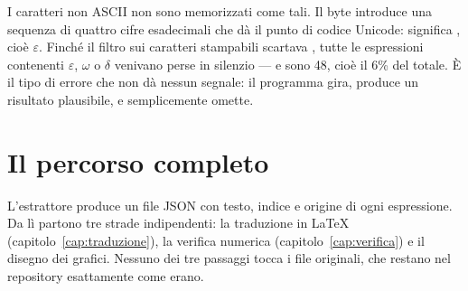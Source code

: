 \begin{osservazione}
I caratteri non ASCII non sono memorizzati come tali. Il byte 
introduce una sequenza di quattro cifre esadecimali che d\`a il punto di
codice Unicode:  significa , cio\`e
$\varepsilon$. Finch\'e il filtro sui caratteri stampabili scartava
, tutte le espressioni contenenti $\varepsilon$, $\omega$ o
$\delta$ venivano perse in silenzio --- e sono 48, cio\`e il 6\% del
totale. \`E il tipo di errore che non d\`a nessun segnale: il programma
gira, produce un risultato plausibile, e semplicemente omette.
\end{osservazione}

\section{Il percorso completo}

\begin{center}
\end{center}

\noindent
L'estrattore produce un file JSON con testo, indice e origine di ogni
espressione. Da l\`i partono tre strade indipendenti: la traduzione in
\LaTeX{} (capitolo~\ref{cap:traduzione}), la verifica numerica
(capitolo~\ref{cap:verifica}) e il disegno dei grafici. Nessuno dei tre
passaggi tocca i file originali, che restano nel repository esattamente
come erano.

